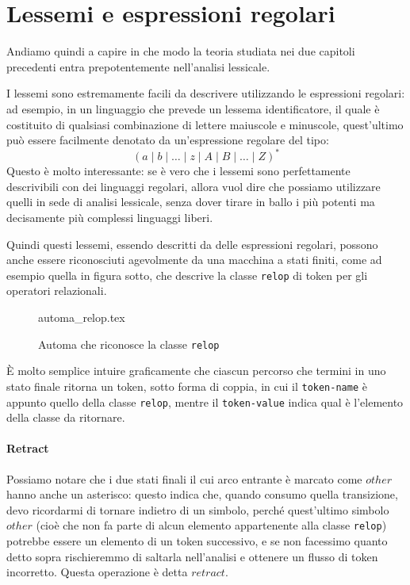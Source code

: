 \documentclass[class=book, crop=false, oneside, 12pt]{standalone}
\begin{document}
\section{Lessemi e espressioni regolari}
Andiamo quindi a capire in che modo la teoria studiata nei due capitoli precedenti entra prepotentemente nell'analisi lessicale.

I lessemi sono estremamente facili da descrivere utilizzando le espressioni regolari: ad esempio, in un linguaggio che prevede un lessema identificatore, il quale è costituito di qualsiasi combinazione di lettere maiuscole e minuscole, quest'ultimo può essere facilmente denotato da un'espressione regolare del tipo:
\begin{equation*}
    (a \mid b \mid \ldots \mid z \mid A \mid B \mid \ldots \mid Z)^*
\end{equation*}
Questo è molto interessante: se è vero che i lessemi sono perfettamente descrivibili con dei linguaggi regolari, allora vuol dire che possiamo utilizzare quelli in sede di analisi lessicale, senza dover tirare in ballo i più potenti ma decisamente più complessi linguaggi liberi.

Quindi questi lessemi, essendo descritti da delle espressioni regolari, possono anche essere riconosciuti agevolmente da una macchina a stati finiti, come ad esempio quella in figura sotto, che descrive la classe \texttt{relop} di token per gli operatori relazionali.

\begin{figure}[H]
    \centering
    {automa_relop.tex}
    \caption{Automa che riconosce la classe \texttt{relop}}
    \label{automaton-relop}
\end{figure}

È molto semplice intuire graficamente che ciascun percorso che termini in uno stato finale ritorna un token, sotto forma di coppia, in cui il \texttt{token-name} è appunto quello della classe \texttt{relop}, mentre il \texttt{token-value} indica qual è l'elemento della classe da ritornare.

\paragraph{Retract}
Possiamo notare che i due stati finali il cui arco entrante è marcato come \(other\) hanno anche un asterisco: questo indica che, quando consumo quella transizione, devo ricordarmi di tornare indietro di un simbolo, perché quest'ultimo simbolo \(other\) (cioè che non fa parte di alcun elemento appartenente alla classe \texttt{relop}) potrebbe essere un elemento di un token successivo, e se non facessimo quanto detto sopra rischieremmo di saltarla nell'analisi e ottenere un flusso di token incorretto. Questa operazione è detta \(retract\).
\end{document}
